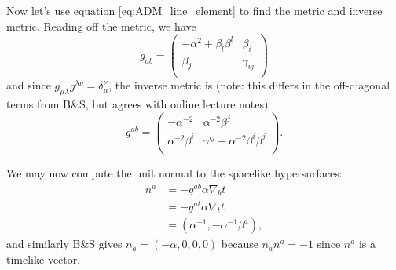\documentclass[12pt]{article}
\numberwithin{equation}{section}
\begin{document}
Now let's use equation \ref{eq:ADM_line_element} to find the metric and inverse metric.  Reading off the metric, we have
\begin{equation}
g_{ab} =
\begin{pmatrix}
-\alpha^{2} + \beta_l \beta^l & \beta_i \\
\beta_j & \gamma_{ij}  \\
\end{pmatrix}
\end{equation}
and since $g_{\mu \lambda} g^{\lambda \nu} = \delta^\nu_\mu$, the inverse metric is (note: this differs in the off-diagonal terms from B\&S, but agrees with online lecture notes)
\begin{equation}
g^{ab} = 
\begin{pmatrix}
-\alpha^{-2} & \alpha^{-2} \beta^j \\
\alpha^{-2} \beta^i & \gamma^{ij} - \alpha^{-2} \beta^{i} \beta^{j} \\
\end{pmatrix}.
\end{equation}

We may now compute the unit normal to the spacelike hypersurfaces:
\begin{equation} \label{eq:timelike_normal}
\begin{aligned}
n^a &= -g^{ab} \alpha \nabla_b t \\
&= -g^{a t} \alpha \nabla_t t \\
&= (\alpha^{-1}, -\alpha^{-1} \beta^{a}),
\end{aligned}
\end{equation}
and similarly B\&S gives $n_a = (-\alpha, 0, 0, 0)$ because $n_a n^a = -1$ since $n^a$ is a timelike vector.
\end{document}
